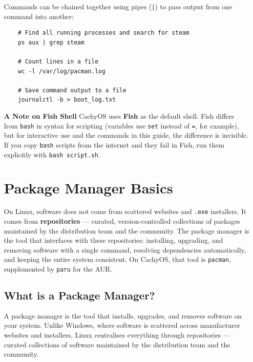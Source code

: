 \documentclass{article}
\newcommand{\code}[1]{\colorbox{codebg}{\texttt{#1}}}
\begin{document}
Commands can be chained together using pipes (\code{|}) to pass output from one
command into another:

\begin{verbatim}
	# Find all running processes and search for steam
	ps aux | grep steam
	
	# Count lines in a file
	wc -l /var/log/pacman.log
	
	# Save command output to a file
	journalctl -b > boot_log.txt
\end{verbatim}

\begin{callout}{\textbf{A Note on Fish Shell}}
	CachyOS uses \textbf{Fish} as the default shell. Fish differs from \code{bash}
	in syntax for scripting (variables use \code{set} instead of \code{=}, for
	example), but for interactive use and the commands in this guide, the difference
	is invisible. If you copy \code{bash} scripts from the internet and they fail in
	Fish, run them explicitly with \code{bash script.sh}.
\end{callout}

\newpage
\section{Package Manager Basics}

On Linux, software does not come from scattered websites and \code{.exe} installers.
It comes from \textbf{repositories} --- curated, version-controlled collections of
packages maintained by the distribution team and the community. The package manager
is the tool that interfaces with these repositories: installing, upgrading, and
removing software with a single command, resolving dependencies automatically, and
keeping the entire system consistent. On CachyOS, that tool is \code{pacman},
supplemented by \code{paru} for the AUR.

\subsection{What is a Package Manager?}

A package manager is the tool that installs, upgrades, and removes software on your
system. Unlike Windows, where software is scattered across manufacturer websites and
installers, Linux centralises everything through repositories --- curated collections
of software maintained by the distribution team and the community.
\end{document}
